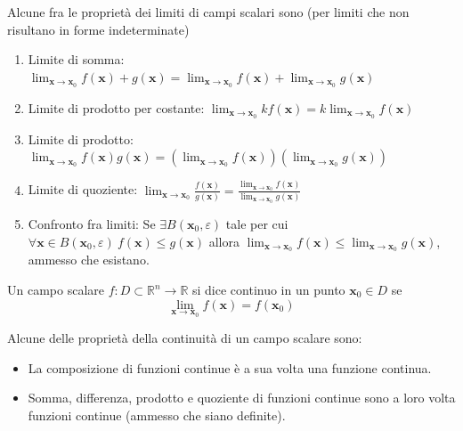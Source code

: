 \documentclass{article}
\begin{document}
            Alcune fra le proprietà dei limiti di campi scalari sono (per limiti che non risultano in forme indeterminate)
            \begin{enumerate}[label=(\arabic*)]
                \item Limite di somma: $\displaystyle \lim_{\mathbf{x} \rightarrow \mathbf{x}_0} f(\mathbf{x}) + g(\mathbf{x}) = \lim_{\mathbf{x} \rightarrow \mathbf{x}_0} f(\mathbf{x}) + \lim_{\mathbf{x} \rightarrow \mathbf{x}_0} g(\mathbf{x})$
                \item Limite di prodotto per costante: $\displaystyle \lim_{\mathbf{x} \rightarrow \mathbf{x}_0} kf(\mathbf{x}) = k\lim_{\mathbf{x} \rightarrow \mathbf{x}_0} f(\mathbf{x})$
                \item Limite di prodotto: $\displaystyle \lim_{\mathbf{x} \rightarrow \mathbf{x}_0} f(\mathbf{x})g(\mathbf{x}) = (\lim_{\mathbf{x} \rightarrow \mathbf{x}_0} f(\mathbf{x})) (\lim_{\mathbf{x} \rightarrow \mathbf{x}_0} g(\mathbf{x}))$
                \item Limite di quoziente: $\displaystyle \lim_{\mathbf{x} \rightarrow \mathbf{x}_0} \frac{f(\mathbf{x})}{g(\mathbf{x})} = \frac{\lim_{\mathbf{x} \rightarrow \mathbf{x}_0} f(\mathbf{x})} {\lim_{\mathbf{x} \rightarrow \mathbf{x}_0} g(\mathbf{x})}$
                \item Confronto fra limiti: Se $\exists B(\mathbf{x}_0, \varepsilon)$ tale per cui $\forall \mathbf{x} \in B(\mathbf{x}_0, \varepsilon) \: f(\mathbf{x}) \leq g(\mathbf{x})$ allora $\displaystyle \lim_{\mathbf{x} \rightarrow \mathbf{x}_0} f(\mathbf{x}) \leq \lim_{\mathbf{x} \rightarrow \mathbf{x}_0} g(\mathbf{x})$, ammesso che esistano.
            \end{enumerate}

            \vspace{10pt}
            Un campo scalare $f: D \subset \mathbb{R}^{n} \rightarrow \mathbb{R}$ si dice continuo in un punto $\mathbf{x}_0 \in D$ se
            \[
                \lim_{\mathbf{x} \rightarrow \mathbf{x}_0} f(\mathbf{x}) = f(\mathbf{x}_0)
            \]

            Alcune delle proprietà della continuità di un campo scalare sono:
            \begin{itemize}
                \item La composizione di funzioni continue è a sua volta una funzione continua.
                \item Somma, differenza, prodotto e quoziente di funzioni continue sono a loro volta funzioni continue (ammesso che siano definite).
            \end{itemize}
\end{document}
